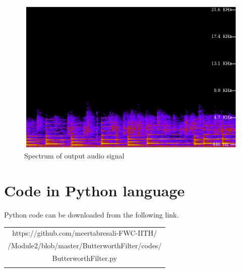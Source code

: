 \documentclass[journal,10pt,twocolumn]{article}
\begin{document}
\begin{figure}[h]

\includegraphics[width=1\columnwidth]{filtered.png}
\caption{Spectrum of output audio signal}
\label{fig:Spectrum of output audio signal}
\end{figure}

\section{Code in Python language}
\centering
Python code can be downloaded from the following link.
\begin{table}[h]
\centering
\begin{tabular}{|c|} \hline
\rule{0pt}{10pt} 
https://github.com/meertabresali-FWC-IITH/\\
/Module2/blob/master/ButterworthFilter/codes/\\
ButterworthFilter.py\\
\\\hline
 \end{tabular}
\end{table}
\end{document}
